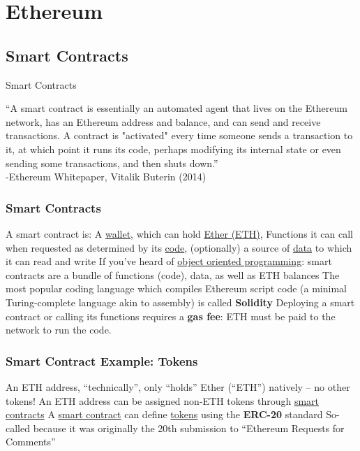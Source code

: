 \documentclass[aspectratio=169]{beamer}
\begin{document}
\section{Ethereum}

\subsection{Smart Contracts}

\begin{frame}{Smart Contracts}

    ``A smart contract is essentially an automated agent that lives on the Ethereum network, has an Ethereum address and balance, and can send and receive transactions. A contract is "activated" every time someone sends a transaction to it, at which point it runs its code, perhaps modifying its internal state or even sending some transactions, and then shuts down.'' \\
 
-Ethereum Whitepaper, Vitalik Buterin (2014)
    
\end{frame}


\begin{frame}
\frametitle{Smart Contracts}

\bi
\m A smart contract is:
\bi
\m A \ul{wallet}, which can hold \ul{Ether (ETH)},
\m Functions it can call when requested as determined by its \ul{code},
\m (optionally) a source of \ul{data} to which it can read and write \pause 
\ei
\m If you've heard of \ul{object oriented programming}: smart contracts are a bundle of functions (code), data, as well as ETH balances \pause
\m The most popular coding language which compiles Ethereum script code (a minimal Turing-complete language akin to assembly) is called \textbf{Solidity} \pause 
\ei
Deploying a smart contract or calling its functions requires a \textbf{gas fee}: ETH must be paid to the network to run the code. 

\end{frame}

\begin{frame}
\frametitle{Smart Contract Example: Tokens}

\bi
\m An ETH address, ``technically'', only ``holds'' Ether (``ETH'') natively -- no other tokens!
\m An ETH address can be assigned non-ETH tokens through \ul{smart contracts}
\m A \ul{smart contract} can define \ul{tokens} using the \textbf{ERC-20} standard 
\bi 
\m So-called because it was originally the 20th submission to ``Ethereum Requests for Comments'' 
\ei 
\ei

\end{frame}
\end{document}
